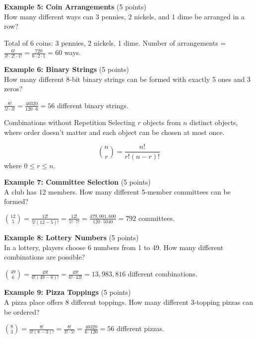 \textbf{Example 5: Coin Arrangements} (5 points)\\
How many different ways can 3 pennies, 2 nickels, and 1 dime be arranged in a row?
\begin{subanswer}
    Total of 6 coins: 3 pennies, 2 nickels, 1 dime. Number of arrangements = $\frac{6!}{3! \cdot 2! \cdot 1!} = \frac{720}{6 \cdot 2 \cdot 1} = 60$ ways.
\end{subanswer}

\textbf{Example 6: Binary Strings} (5 points)\\
How many different 8-bit binary strings can be formed with exactly 5 ones and 3 zeros?
\begin{subanswer}
    $\frac{8!}{5! \cdot 3!} = \frac{40320}{120 \cdot 6} = 56$ different binary strings.
\end{subanswer}


\newpage 



\begin{define}{Combinations without Repetition}
    Selecting $r$ objects from $n$ distinct objects, where order doesn't matter 
    and each object can be chosen at most once.
    
    $$\binom{n}{r} = \frac{n!}{r!(n-r)!}$$
    where $0 \leq r \leq n$.
  \end{define}

\textbf{Example 7: Committee Selection} (5 points)\\
A club has 12 members. How many different 5-member committees can be formed?
\begin{subanswer}
    $\binom{12}{5} = \frac{12!}{5!(12-5)!} = \frac{12!}{5! \cdot 7!} = \frac{479,001,600}{120 \cdot 5040} = 792$ committees.
\end{subanswer}

\textbf{Example 8: Lottery Numbers} (5 points)\\
In a lottery, players choose 6 numbers from 1 to 49. How many different combinations are possible?
\begin{subanswer}
    $\binom{49}{6} = \frac{49!}{6!(49-6)!} = \frac{49!}{6! \cdot 43!} = 13,983,816$ different combinations.
\end{subanswer}

\textbf{Example 9: Pizza Toppings} (5 points)\\
A pizza place offers 8 different toppings. How many different 3-topping pizzas can be ordered?
\begin{subanswer}
    $\binom{8}{3} = \frac{8!}{3!(8-3)!} = \frac{8!}{3! \cdot 5!} = \frac{40320}{6 \cdot 120} = 56$ different pizzas.
\end{subanswer}

